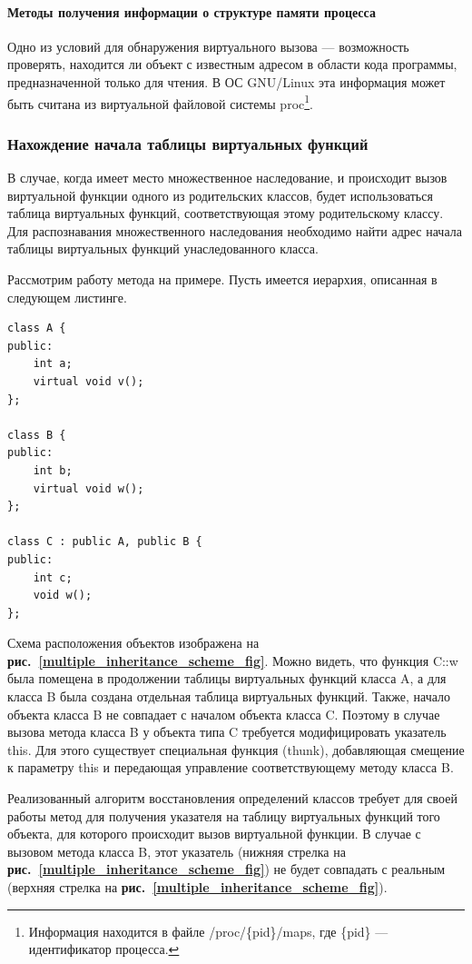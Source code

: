 \documentclass[a4paper,12pt,russian]{article}
\newcommand{\picref}[1]{\textbf{рис.~\ref{#1}}}
\newcommand{\code}[1]{\textsf{#1}}
\begin{document}
\paragraph{Методы получения информации о структуре памяти процесса}
Одно из условий для обнаружения виртуального вызова --- возможность проверять, находится ли объект с известным адресом в области кода программы, предназначенной только для чтения.
В ОС GNU/Linux эта информация может быть считана из виртуальной файловой системы \code{proc}\footnote{Информация находится в файле \code{/proc/\{pid\}/maps}, где \code{\{pid\}} --- идентификатор процесса.}.

\subsubsection{Нахождение начала таблицы виртуальных функций}
В случае, когда имеет место множественное наследование, и происходит вызов виртуальной функции одного из родительских классов, будет использоваться таблица виртуальных функций, соответствующая этому родительскому классу.
Для распознавания множественного наследования необходимо найти адрес начала таблицы виртуальных функций унаследованного класса.

Рассмотрим работу метода на примере. Пусть имеется иерархия, описанная в следующем листинге.
\begin{lstlisting}
class A {
public:
    int a;
    virtual void v();
};

class B {
public:
    int b;
    virtual void w();
};

class C : public A, public B {
public:
    int c;
    void w();
};
\end{lstlisting}
Схема расположения объектов изображена на \picref{multiple_inheritance_scheme_fig}.
Можно видеть, что функция \code{C::w} была помещена в продолжении таблицы виртуальных функций класса \code{A}, а для класса \code{B} была создана отдельная таблица виртуальных функций.
Также, начало объекта класса \code{B} не совпадает с началом объекта класса \code{C}.
Поэтому в случае вызова метода класса \code{B} у объекта типа \code{C} требуется модифицировать указатель \code{this}.
Для этого существует специальная функция (\code{thunk}), добавляющая смещение к параметру \code{this} и передающая управление соответствующему методу класса \code{B}.

Реализованный алгоритм восстановления определений классов требует для своей работы метод для получения указателя на таблицу виртуальных функций того объекта, для которого происходит вызов виртуальной функции.
В случае с вызовом метода класса \code{B}, этот указатель (нижняя стрелка на \picref{multiple_inheritance_scheme_fig}) не будет совпадать с реальным (верхняя стрелка на \picref{multiple_inheritance_scheme_fig}).
\end{document}
